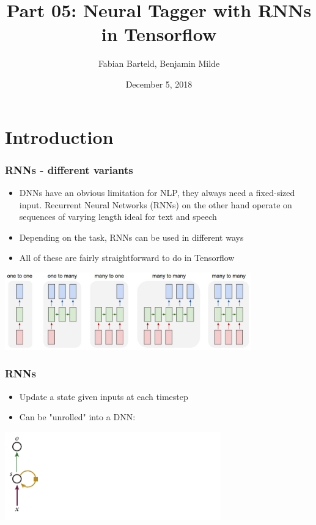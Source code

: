 \documentclass{beamer}
\title{Part 05: Neural Tagger with RNNs in Tensorflow}
\author{Fabian Barteld, Benjamin Milde}
\date[5.12.2018]{December 5, 2018}
\begin{document}
\maketitle

%
%

\section{Introduction}

\begin{frame}[fragile]
\frametitle{RNNs - different variants}
  \begin{itemize}
  	\item DNNs have an obvious limitation for NLP, they always need a fixed-sized input. Recurrent Neural Networks (RNNs) on the other hand operate on sequences of varying length \rightarrow ideal for text and speech
    \item Depending on the task, RNNs can be used in different ways
  	\item All of these are fairly straightforward to do in Tensorflow
  \end{itemize}
    \begin{center}
		\includegraphics[width=0.8\textwidth]{05_rnn_variants}
	 \end{center}
\end{frame}

\begin{frame}[fragile]
\frametitle{RNNs}
  \begin{itemize}
  	\item Update a state given inputs at each timestep
  	\item Can be "unrolled" into a DNN:
  \end{itemize}
    \begin{center}
  		\includegraphics[width=0.7\textwidth]{05_RNN_schema}
  	\end{center}

\end{frame}
\end{document}
